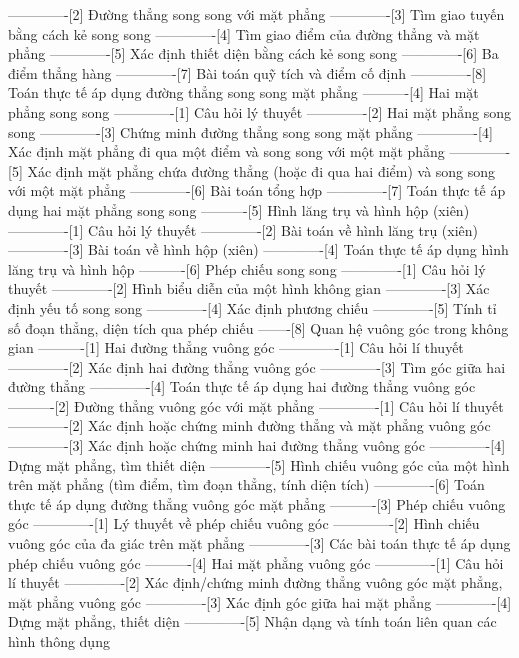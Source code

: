 -------------[2] Đường thẳng song song với mặt phẳng
-------------[3] Tìm giao tuyến bằng cách kẻ song song
-------------[4] Tìm giao điểm của đường thẳng và mặt phẳng
-------------[5] Xác định thiết diện bằng cách kẻ song song
-------------[6] Ba điểm thẳng hàng
-------------[7] Bài toán quỹ tích và điểm cố định
-------------[8] Toán thực tế áp dụng đường thẳng song song mặt phẳng
----------[4] Hai mặt phẳng song song
-------------[1] Câu hỏi lý thuyết
-------------[2] Hai mặt phẳng song song
-------------[3] Chứng minh đường thẳng song song mặt phẳng
-------------[4] Xác định mặt phẳng đi qua một điểm và song song với một mặt phẳng
-------------[5] Xác định mặt phẳng chứa đường thẳng (hoặc đi qua hai điểm) và song song với một mặt phẳng
-------------[6] Bài toán tổng hợp
-------------[7] Toán thực tế áp dụng hai mặt phẳng song song
----------[5] Hình lăng trụ và hình hộp (xiên)
-------------[1] Câu hỏi lý thuyết
-------------[2] Bài toán về hình lăng trụ (xiên)
-------------[3] Bài toán về hình hộp (xiên)
-------------[4] Toán thực tế áp dụng hình lăng trụ và hình hộp
----------[6] Phép chiếu song song
-------------[1] Câu hỏi lý thuyết
-------------[2] Hình biểu diễn của một hình không gian
-------------[3] Xác định yếu tố song song
-------------[4] Xác định phương chiếu
-------------[5] Tính tỉ số đoạn thẳng, diện tích qua phép chiếu
-------[8] Quan hệ vuông góc trong không gian
----------[1] Hai đường thẳng vuông góc
-------------[1] Câu hỏi lí thuyết
-------------[2] Xác định hai đường thẳng vuông góc
-------------[3] Tìm góc giữa hai đường thẳng
-------------[4] Toán thực tế áp dụng hai đường thẳng vuông góc
----------[2] Đường thẳng vuông góc với mặt phẳng
-------------[1] Câu hỏi lí thuyết
-------------[2] Xác định hoặc chứng minh đường thẳng và mặt phẳng vuông góc
-------------[3] Xác định hoặc chứng minh hai đường thẳng vuông góc
-------------[4] Dựng mặt phẳng, tìm thiết diện
-------------[5] Hình chiếu vuông góc của một hình trên mặt phẳng (tìm điểm, tìm đoạn thẳng, tính diện tích)
-------------[6] Toán thực tế áp dụng đường thẳng vuông góc mặt phẳng
----------[3] Phép chiếu vuông góc
-------------[1] Lý thuyết về phép chiếu vuông góc
-------------[2] Hình chiếu vuông góc của đa giác trên mặt phẳng
-------------[3] Các bài toán thực tế áp dụng phép chiếu vuông góc
----------[4] Hai mặt phẳng vuông góc
-------------[1] Câu hỏi lí thuyết
-------------[2] Xác định/chứng minh đường thẳng vuông góc mặt phẳng, mặt phẳng vuông góc
-------------[3] Xác định góc giữa hai mặt phẳng
-------------[4] Dựng mặt phẳng, thiết diện
-------------[5] Nhận dạng và tính toán liên quan các hình thông dụng
